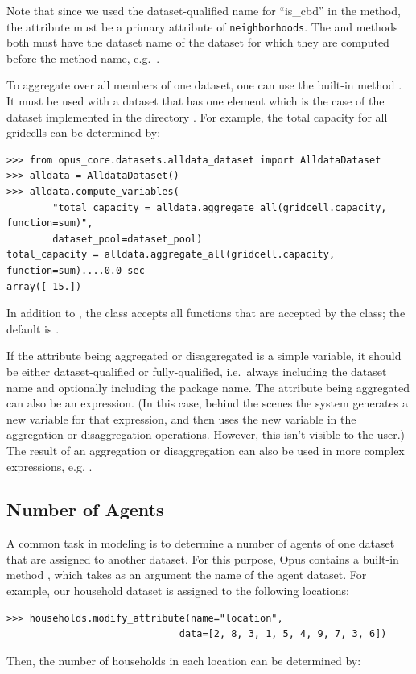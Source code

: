 Note that since we used the dataset-qualified name for
``is_cbd'' in the  method, the attribute must be a
primary attribute of \verb|neighborhoods|.  The
 and  methods both must have the
dataset name of the dataset for which they are computed before the method
name, e.g.\ .

To aggregate over all members of one dataset, one can use the
built-in method . It must be used with a dataset
  that has one element which is the case of the
 dataset 
implemented in the directory . For example, the total
capacity for all gridcells can be determined by:

\begin{verbatim}
>>> from opus_core.datasets.alldata_dataset import AlldataDataset
>>> alldata = AlldataDataset()
>>> alldata.compute_variables(
        "total_capacity = alldata.aggregate_all(gridcell.capacity, function=sum)",
        dataset_pool=dataset_pool)
total_capacity = alldata.aggregate_all(gridcell.capacity, function=sum)....0.0 sec
array([ 15.])
\end{verbatim}
In addition to , the  class accepts all
functions that are accepted by the  class;
the default is .

If the attribute being aggregated or disaggregated is a simple variable, it
should be either dataset-qualified or fully-qualified, i.e.\ always
including the dataset name and optionally including the package name.  The
attribute being aggregated can also be an expression.  (In this case,
behind the scenes the system generates a new variable for that expression,
and then uses the new variable in the aggregation or disaggregation
operations.  However, this isn't visible to the user.)  The result of an
aggregation or disaggregation can also be used in more complex expressions,
e.g. .

\subsection{Number of Agents}

A common task in modeling is to determine a number of agents of one dataset
  that are assigned to another dataset. For this
purpose, Opus contains a built-in method , which
takes as an argument the name of the agent dataset. For
example, our household dataset is assigned to the following
locations:
\begin{verbatim}
>>> households.modify_attribute(name="location",
                              data=[2, 8, 3, 1, 5, 4, 9, 7, 3, 6])
\end{verbatim}
Then, the number of households in each location can be determined by:


